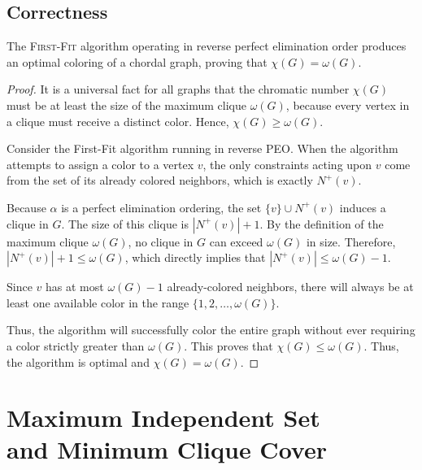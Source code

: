 \subsection{Correctness}

\begin{theorem}
The \textsc{First-Fit} algorithm operating in reverse perfect elimination order produces an optimal coloring of a chordal graph, proving that $\chi(G) = \omega(G)$.
\end{theorem}
\begin{proof}
It is a universal fact for all graphs that the chromatic number $\chi(G)$ must be at least the size of the maximum clique $\omega(G)$, because every vertex in a clique must receive a distinct color. Hence, $\chi(G) \ge \omega(G)$.

Consider the First-Fit algorithm running in reverse PEO. When the algorithm attempts to assign a color to a vertex $v$, the only constraints acting upon $v$ come from the set of its already colored neighbors, which is exactly $N^+(v)$. 

Because $\alpha$ is a perfect elimination ordering, the set $\{v\} \cup N^+(v)$ induces a clique in $G$. The size of this clique is $|N^+(v)| + 1$. By the definition of the maximum clique $\omega(G)$, no clique in $G$ can exceed $\omega(G)$ in size. Therefore, $|N^+(v)| + 1 \le \omega(G)$, which directly implies that $|N^+(v)| \le \omega(G) - 1$.

Since $v$ has at most $\omega(G) - 1$ already-colored neighbors, there will always be at least one available color in the range $\{1, 2, \dots, \omega(G)\}$. 

Thus, the algorithm will successfully color the entire graph without ever requiring a color strictly greater than $\omega(G)$. This proves that $\chi(G) \le \omega(G)$. Thus, the algorithm is optimal and $\chi(G) = \omega(G)$.
\end{proof}


\section[Maximum Independent Set and Minimum Clique Cover]{Maximum Independent Set\\ and Minimum Clique Cover}

